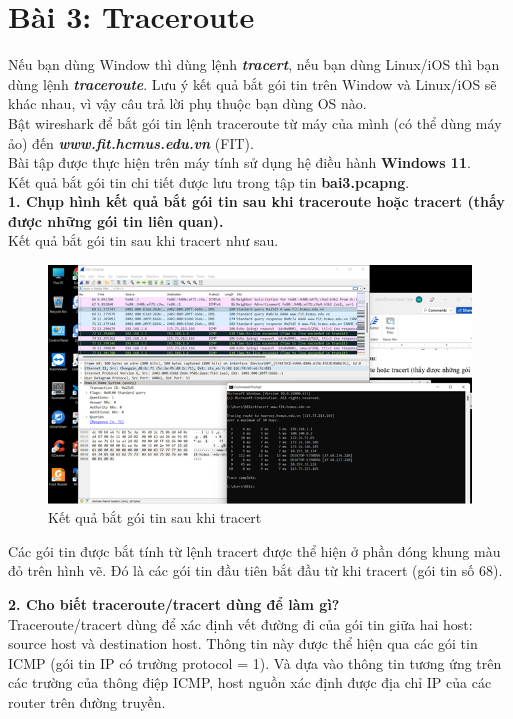 \section{Bài 3: Traceroute}
Nếu bạn dùng Window thì dùng lệnh \textbf{\textit{tracert}}, nếu bạn dùng Linux/iOS thì bạn dùng lệnh \textbf{\textit{traceroute}}. Lưu ý kết quả bắt gói tin trên Window và Linux/iOS sẽ khác nhau, vì vậy câu trả lời phụ thuộc bạn dùng OS nào.\\
Bật wireshark để bắt gói tin lệnh traceroute từ máy của mình (có thể dùng máy ảo) đến \textbf{\textit{www.fit.hcmus.edu.vn}} (FIT). \\
Bài tập được thực hiện trên máy tính sử dụng hệ điều hành \textbf{Windows 11}.\\
Kết quả bắt gói tin chi tiết được lưu trong tập tin \textbf{bai3.pcapng}.\\

\textbf{1. Chụp hình kết quả bắt gói tin sau khi traceroute hoặc tracert (thấy được những gói tin liên quan).}\\
Kết quả bắt gói tin sau khi tracert như sau.
\begin{figure}[H]
\begin{center}
\includegraphics[scale=1]{../figures/p3/p3_res1}
\end{center}
\caption{Kết quả bắt gói tin sau khi tracert}
\end{figure}
Các gói tin được bắt tính từ lệnh tracert được thể hiện ở phần đóng khung màu đỏ trên hình vẽ. Đó là các gói tin đầu tiên bắt đầu từ khi tracert (gói tin số 68).

\textbf{2. Cho biết traceroute/tracert dùng để làm gì?}\\
Traceroute/tracert dùng để xác định vết đường đi của gói tin giữa hai host: source host và destination host. 
Thông tin này được thể hiện qua các gói tin ICMP (gói tin IP có trường protocol = 1). Và dựa vào thông tin tương ứng trên các trường của thông điệp ICMP, host nguồn xác định được địa chỉ IP của các router trên đường truyền. \supercite{slides, cn}

